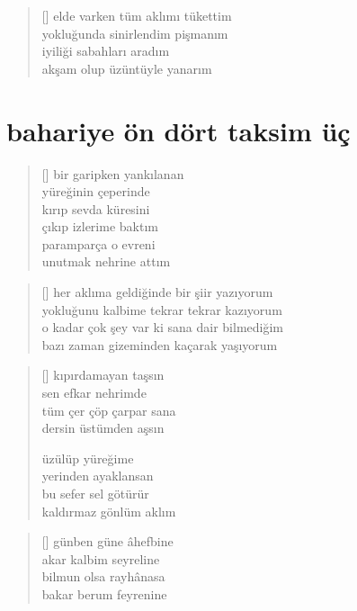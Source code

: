 \documentclass[a5paper, openright, twoside]{memoir}
\begin{document}
\begin{verse}[\versewidth]
  elde varken tüm aklımı tükettim \\
  yokluğunda sinirlendim pişmanım \\
  iyiliği sabahları aradım \\
  akşam olup üzüntüyle yanarım
\end{verse}
\chapter{bahariye ön dört taksim üç}
\begin{verse}[\versewidth]
  bir garipken yankılanan \\
  yüreğinin çeperinde \\
  kırıp sevda küresini \\
  çıkıp izlerime baktım \\
  paramparça o evreni \\
  unutmak nehrine attım
\end{verse}
\begin{verse}[\versewidth]
  her aklıma geldiğinde bir şiir yazıyorum \\
  yokluğunu kalbime tekrar tekrar kazıyorum \\
  o kadar çok şey var ki sana dair bilmediğim \\
  bazı zaman gizeminden kaçarak yaşıyorum
\end{verse}
\begin{verse}[\versewidth]
  kıpırdamayan taşsın \\
  sen efkar nehrimde \\
  tüm çer çöp çarpar sana \\
  dersin üstümden aşsın

  üzülüp yüreğime \\
  yerinden ayaklansan \\
  bu sefer sel götürür \\
  kaldırmaz gönlüm aklım
\end{verse}
\begin{verse}[\versewidth]
  günben güne âhefbine \\
  akar kalbim seyreline \\
  bilmun olsa rayhânasa \\
  bakar berum feyrenine
\end{verse}
\end{document}
